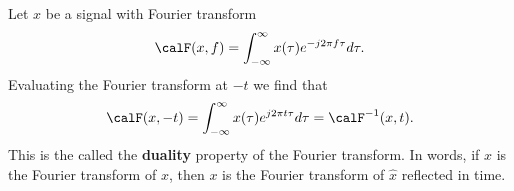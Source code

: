 \documentclass[11pt,a4paper]{book}
\theoremstyle{plain}
\numberwithin{equation}{section}
\newcommand{\term}{\textbf}
\begin{document}



Let $x$ be a signal with Fourier transform
\[
\calF(x,f) = \int_{-\infty}^{\infty} x(\tau) e^{-j2\pi f \tau} d\tau.
\]
Evaluating the Fourier transform at $-t$ we find that
\begin{equation}\label{eq:dualityft}
\calF(x,-t) = \int_{-\infty}^{\infty} x(\tau) e^{j2\pi t \tau} d\tau = \calF^{-1}(x,t).
\end{equation}
This is the called the \term{duality} property of the Fourier transform.  In words, if $\hat{x}$ is the Fourier transform of $x$, then $x$ is the Fourier transform of $\hat{x}$ reflected in time.    %
\end{document}
